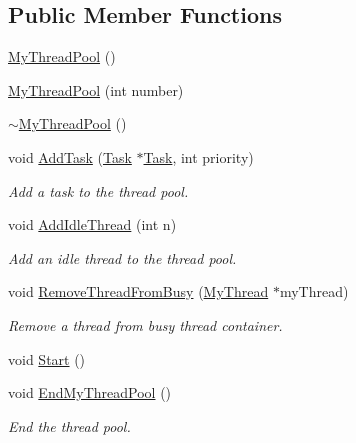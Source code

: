 \subsection*{Public Member Functions}
\begin{DoxyCompactItemize}
\item 
\hyperlink{classMyThreadPool_a04294a435753b308cf6824a75d74276c}{My\+Thread\+Pool} ()
\item 
\hyperlink{classMyThreadPool_a40cbc85efab055210ea6d877a22cc39a}{My\+Thread\+Pool} (int number)
\item 
\hyperlink{classMyThreadPool_aa5b063c10015672f734136a04aad676c}{$\sim$\+My\+Thread\+Pool} ()
\item 
void \hyperlink{classMyThreadPool_a374ac295e70a29caa3da47f58c2342ac}{Add\+Task} (\hyperlink{classTask}{Task} $\ast$\hyperlink{classTask}{Task}, int priority)
\begin{DoxyCompactList}\small\item\em Add a task to the thread pool. \end{DoxyCompactList}\item 
void \hyperlink{classMyThreadPool_aae8e3a40bf8be12e3dd5511f5d294b89}{Add\+Idle\+Thread} (int n)
\begin{DoxyCompactList}\small\item\em Add an idle thread to the thread pool. \end{DoxyCompactList}\item 
void \hyperlink{classMyThreadPool_afacd09493b96072c1201458b77f91ea9}{Remove\+Thread\+From\+Busy} (\hyperlink{classMyThread}{My\+Thread} $\ast$my\+Thread)
\begin{DoxyCompactList}\small\item\em Remove a thread from busy thread container. \end{DoxyCompactList}\item 
void \hyperlink{classMyThreadPool_a821cbd5122c8c1b13468d98a41497bdf}{Start} ()
\item 
void \hyperlink{classMyThreadPool_a9cda728b68b6a0f6c7447b7278e589ff}{End\+My\+Thread\+Pool} ()
\begin{DoxyCompactList}\small\item\em End the thread pool. \end{DoxyCompactList}\end{DoxyCompactItemize}
